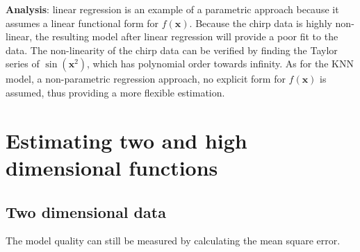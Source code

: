 \documentclass[]{article}
\begin{document}
\textbf{Analysis}: linear regression is an example of a parametric approach because it assumes a linear functional form for $f(\mathbf{x})$. Because the chirp data is highly non-linear, the resulting model after linear regression will provide a poor fit to the data. The non-linearity of the chirp data can be verified by finding the Taylor series of $\sin(\mathbf{x}^2)$, which has polynomial order towards infinity. As for the KNN model, a non-parametric regression approach, no explicit form for $f(\mathbf{x})$ is assumed, thus providing a more flexible estimation. 

\section{Estimating two and high dimensional functions}

\subsection{Two dimensional data}

The model quality can still be measured by calculating the  mean square error.
\end{document}
